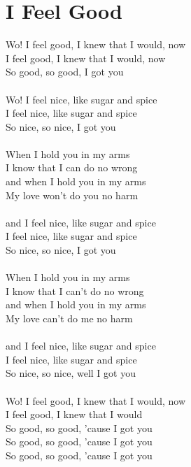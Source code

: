 \section{I Feel Good}
Wo! I feel good, I knew that I would, now\\
I feel good, I knew that I would, now\\
So good, so good, I got you\\
\\
Wo! I feel nice, like sugar and spice\\
I feel nice, like sugar and spice\\
So nice, so nice, I got you\\
\\
When I hold you in my arms\\
I know that I can do no wrong\\
and when I hold you in my arms\\
My love won't do you no harm\\
\\
and I feel nice, like sugar and spice\\
I feel nice, like sugar and spice\\
So nice, so nice, I got you\\
\\
When I hold you in my arms\\
I know that I can't do no wrong\\
and when I hold you in my arms\\
My love can't do me no harm\\
\\
and I feel nice, like sugar and spice\\
I feel nice, like sugar and spice\\
So nice, so nice, well I got you\\
\\
Wo! I feel good, I knew that I would, now\\
I feel good, I knew that I would\\
So good, so good, 'cause I got you\\
So good, so good, 'cause I got you\\
So good, so good, 'cause I got you\\